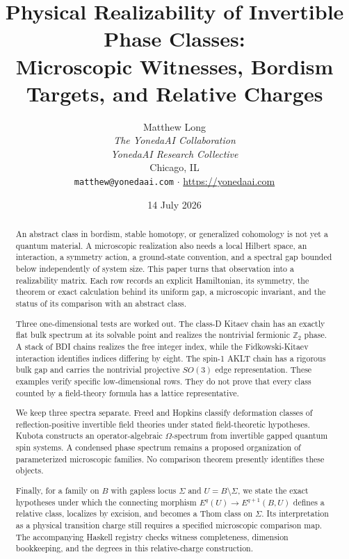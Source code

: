 \documentclass[12pt]{article}
\title{Physical Realizability of Invertible Phase Classes:\\
Microscopic Witnesses, Bordism Targets, and Relative Charges}
\author{Matthew Long \\
\textit{The YonedaAI Collaboration} \\
\textit{YonedaAI Research Collective} \\
Chicago, IL \\
\texttt{matthew@yonedaai.com} $\cdot$ \url{https://yonedaai.com}}
\date{14 July 2026}
\theoremstyle{definition}
\theoremstyle{remark}
\begin{document}
\maketitle

\begin{abstract}
An abstract class in bordism, stable homotopy, or generalized cohomology is
not yet a quantum material.  A microscopic realization also needs a local
Hilbert space, an interaction, a symmetry action, a ground-state convention,
and a spectral gap bounded below independently of system size.  This paper
turns that observation into a realizability matrix.  Each row records an
explicit Hamiltonian, its symmetry, the theorem or exact calculation behind
its uniform gap, a microscopic invariant, and the status of its comparison
with an abstract class.

Three one-dimensional tests are worked out.  The class-D Kitaev chain has an
exactly flat bulk spectrum at its solvable point and realizes the nontrivial
fermionic $\mathbb Z_2$ phase.  A stack of BDI chains realizes the free
integer index, while the Fidkowski-Kitaev interaction identifies indices
differing by eight.  The spin-1 AKLT chain has a rigorous bulk gap and carries
the nontrivial projective $SO(3)$ edge representation.  These examples verify
specific low-dimensional rows.  They do not prove that every class counted
by a field-theory formula has a lattice representative.

We keep three spectra separate.  Freed and Hopkins classify deformation
classes of reflection-positive invertible field theories under stated
field-theoretic hypotheses.  Kubota constructs an operator-algebraic
$\Omega$-spectrum from invertible gapped quantum spin systems.  A condensed
phase spectrum remains a proposed organization of parameterized microscopic
families.  No comparison theorem presently identifies these objects.

Finally, for a family on $B$ with gapless locus $\Sigma$ and
$U=B\setminus\Sigma$, we state the exact hypotheses under which the
connecting morphism
$E^q(U)\to E^{q+1}(B,U)$ defines a relative class, localizes by excision, and
becomes a Thom class on $\Sigma$.  Its interpretation as a physical
transition charge still requires a specified microscopic comparison map.
The accompanying Haskell registry checks witness completeness, dimension
bookkeeping, and the degrees in this relative-charge construction.
\end{abstract}

\tableofcontents
\end{document}
